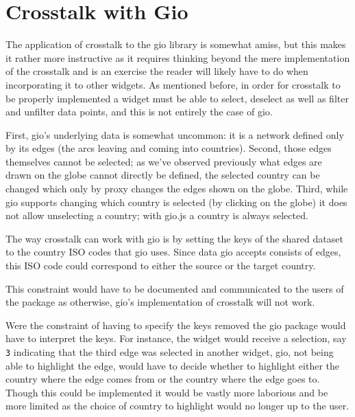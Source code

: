 \documentclass[
]{krantz}
\makeatletter
\newenvironment{Shaded}{\begin{snugshade}}{\end{snugshade}}
\newcommand{\CommentTok}[1]{\textcolor[rgb]{0.37,0.37,0.37}{\textit{#1}}}
\newcommand{\DataTypeTok}[1]{\textcolor[rgb]{0.27,0.27,0.27}{#1}}
\newcommand{\KeywordTok}[1]{\textcolor[rgb]{0.27,0.27,0.27}{\textbf{#1}}}
\newcommand{\NormalTok}[1]{#1}
\newcommand{\OperatorTok}[1]{\textcolor[rgb]{0.43,0.43,0.43}{\textbf{#1}}}
\newcommand{\StringTok}[1]{\textcolor[rgb]{0.5,0.5,0.5}{#1}}
\newenvironment{kframe}{%
\medskip{}
\setlength{\fboxsep}{.8em}
 \def\at@end@of@kframe{}%
 \ifinner\ifhmode%
  \def\at@end@of@kframe{\end{minipage}}%
  \begin{minipage}{\columnwidth}%
 \fi\fi%
 \def\FrameCommand##1{\hskip\@totalleftmargin \hskip-\fboxsep
 \colorbox{shadecolor}{##1}\hskip-\fboxsep
     \hskip-\linewidth \hskip-\@totalleftmargin \hskip\columnwidth}%
 \MakeFramed {\advance\hsize-\width
   \@totalleftmargin\z@ \linewidth\hsize
   \@setminipage}}%
 {\par\unskip\endMakeFramed%
 \at@end@of@kframe}
\renewenvironment{Shaded}{\begin{kframe}}{\end{kframe}}
\makeatother
\begin{document}
\hypertarget{linking-widgets-gio}{%
\section{Crosstalk with Gio}\label{linking-widgets-gio}}

The application of crosstalk to the gio library is somewhat amiss, but this makes it rather more instructive as it requires thinking beyond the mere implementation of the crosstalk and is an exercise the reader will likely have to do when incorporating it to other widgets. As mentioned before, in order for crosstalk to be properly implemented a widget must be able to select, deselect as well as filter and unfilter data points, and this is not entirely the case of gio.

First, gio's underlying data is somewhat uncommon: it is a network defined only by its edges (the arcs leaving and coming into countries). Second, those edges themselves cannot be selected; as we've observed previously what edges are drawn on the globe cannot directly be defined, the selected country can be changed which only by proxy changes the edges shown on the globe. Third, while gio supports changing which country is selected (by clicking on the globe) it does not allow unselecting a country; with gio.js a country is always selected.

The way crosstalk can work with gio is by setting the keys of the shared dataset to the country ISO codes that gio uses. Since data gio accepts consists of edges, this ISO code could correspond to either the source or the target country.

\begin{Shaded}
\end{Shaded}

This constraint would have to be documented and communicated to the users of the package as otherwise, gio's implementation of crosstalk will not work.

Were the constraint of having to specify the keys removed the gio package would have to interpret the keys. For instance, the widget would receive a selection, say \texttt{3} indicating that the third edge was selected in another widget, gio, not being able to highlight the edge, would have to decide whether to highlight either the country where the edge comes from or the country where the edge goes to. Though this could be implemented it would be vastly more laborious and be more limited as the choice of country to highlight would no longer up to the user.
\end{document}
